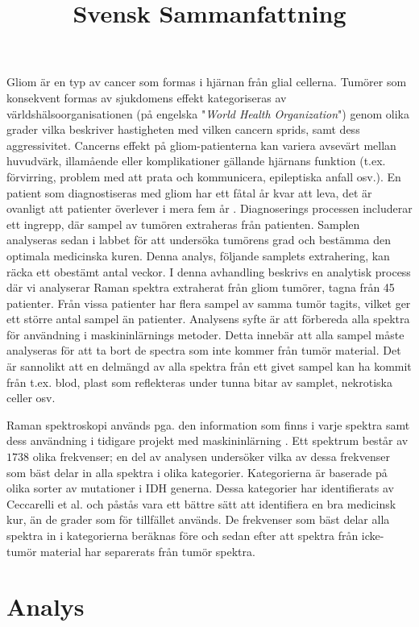 \title{Svensk Sammanfattning}

Gliom är en typ av cancer som formas i hjärnan från glial cellerna. Tumörer som konsekvent formas av sjukdomens effekt kategoriseras av världshälsoorganisationen (på engelska "\textit{World Health Organization}") genom olika grader vilka beskriver hastigheten med vilken cancern sprids, samt dess aggressivitet. Cancerns effekt på gliom-patienterna kan variera avsevärt mellan huvudvärk, illamående eller komplikationer gällande hjärnans funktion (t.ex. förvirring, problem med att prata och kommunicera, epileptiska anfall osv.). En patient som diagnostiseras med gliom har ett fåtal år kvar att leva, det är ovanligt att patienter överlever i mera fem år \cite{glialcells, gallego2015nonsurgical, bleeker2012recent}. Diagnoserings processen includerar ett ingrepp, där sampel av tumören extraheras från patienten. Samplen analyseras sedan i labbet för att undersöka tumörens grad och bestämma den optimala medicinska kuren. Denna analys, följande samplets extrahering, kan räcka ett obestämt antal veckor. I denna avhandling beskrivs en analytisk process där vi analyserar Raman spektra extraherat från gliom tumörer, tagna från 45 patienter. Från vissa patienter har flera sampel av samma tumör tagits, vilket ger ett större antal sampel än patienter. Analysens syfte är att förbereda alla spektra för användning i maskininlärnings metoder. Detta innebär att alla sampel måste analyseras för att ta bort de spectra som inte kommer från tumör material. Det är sannolikt att en delmängd av alla spektra från ett givet sampel kan ha kommit från t.ex. blod, plast som reflekteras under tunna bitar av samplet, nekrotiska celler osv.

Raman spektroskopi används pga. den information som finns i varje spektra samt dess användning i tidigare projekt med maskininlärning \cite{ramanDL, ho2019rapid}. Ett spektrum består av $1738$ olika frekvenser; en del av analysen undersöker vilka av dessa frekvenser som bäst delar in alla spektra i olika kategorier. Kategorierna är baserade på olika sorter av mutationer i IDH generna. Dessa kategorier har identifierats av Ceccarelli et al. \cite{cellsubsets} och påstås vara ett bättre sätt att identifiera en bra medicinsk kur, än de grader som för tillfället används. De frekvenser som bäst delar alla spektra in i kategorierna beräknas före och sedan efter att spektra från icke-tumör material har separerats från tumör spektra.

\section*{Analys}


